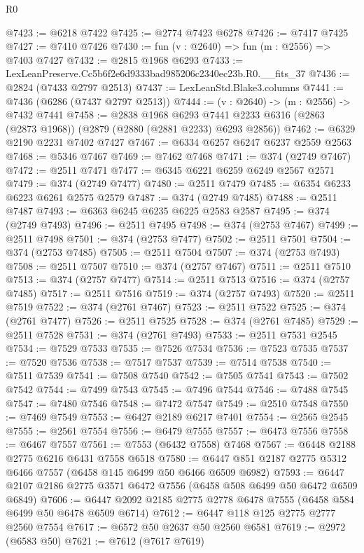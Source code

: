\begin{lexlean}{R0}
\begin{coremodule}
@7423 := @6218 @7422
@7425 := @2774 @7423 @6278
@7426 := @7417 @7425
@7427 := @7410 @7426
@7430 := fun (v : @2640) => fun (m : @2556) => @7403 @7427
@7432 := @2815 @1968 @6293
@7433 := LexLeanPreserve.Cc5b6f2e6d9333bad985206c2340ec23b.R0.__fits_37
@7436 := @2824 (@7433 @2797 @2513)
@7437 := LexLeanStd.Blake3.columns
@7441 := @7436 (@6286 (@7437 @2797 @2513))
@7444 := (v : @2640) -> (m : @2556) -> @7432 @7441
@7458 := @2838
    @1968
    @6293
    @7441
    @2233
    @6316
    (@2863 (@2873 @1968))
    (@2879 (@2880 (@2881 @2233) @6293 @2856))
@7462 := @6329 @2190 @2231 @7402 @7427
@7467 := @6334 @6257 @6247 @6237 @2559 @2563
@7468 := @5346 @7467
@7469 := @7462 @7468
@7471 := @374 (@2749 @7467)
@7472 := @2511 @7471
@7477 := @6345 @6221 @6259 @6249 @2567 @2571
@7479 := @374 (@2749 @7477)
@7480 := @2511 @7479
@7485 := @6354 @6233 @6223 @6261 @2575 @2579
@7487 := @374 (@2749 @7485)
@7488 := @2511 @7487
@7493 := @6363 @6245 @6235 @6225 @2583 @2587
@7495 := @374 (@2749 @7493)
@7496 := @2511 @7495
@7498 := @374 (@2753 @7467)
@7499 := @2511 @7498
@7501 := @374 (@2753 @7477)
@7502 := @2511 @7501
@7504 := @374 (@2753 @7485)
@7505 := @2511 @7504
@7507 := @374 (@2753 @7493)
@7508 := @2511 @7507
@7510 := @374 (@2757 @7467)
@7511 := @2511 @7510
@7513 := @374 (@2757 @7477)
@7514 := @2511 @7513
@7516 := @374 (@2757 @7485)
@7517 := @2511 @7516
@7519 := @374 (@2757 @7493)
@7520 := @2511 @7519
@7522 := @374 (@2761 @7467)
@7523 := @2511 @7522
@7525 := @374 (@2761 @7477)
@7526 := @2511 @7525
@7528 := @374 (@2761 @7485)
@7529 := @2511 @7528
@7531 := @374 (@2761 @7493)
@7533 := @2511 @7531 @2545
@7534 := @7529 @7533
@7535 := @7526 @7534
@7536 := @7523 @7535
@7537 := @7520 @7536
@7538 := @7517 @7537
@7539 := @7514 @7538
@7540 := @7511 @7539
@7541 := @7508 @7540
@7542 := @7505 @7541
@7543 := @7502 @7542
@7544 := @7499 @7543
@7545 := @7496 @7544
@7546 := @7488 @7545
@7547 := @7480 @7546
@7548 := @7472 @7547
@7549 := @2510 @7548
@7550 := @7469 @7549
@7553 := @6427 @2189 @6217 @7401
@7554 := @2565 @2545
@7555 := @2561 @7554
@7556 := @6479 @7555
@7557 := @6473 @7556
@7558 := @6467 @7557
@7561 := @7553 (@6432 @7558) @7468
@7567 := @6448 @2188 @2775 @6216 @6431 @7558 @6518
@7580 := @6447 @851 @2187 @2775 @5312 @6466 @7557 (@6458 @145 @6499 @50 @6466 @6509 @6982)
@7593 := @6447 @2107 @2186 @2775 @3571 @6472 @7556 (@6458 @508 @6499 @50 @6472 @6509 @6849)
@7606 := @6447 @2092 @2185 @2775 @2778 @6478 @7555 (@6458 @584 @6499 @50 @6478 @6509 @6714)
@7612 := @6447 @118 @125 @2775 @2777 @2560 @7554
@7617 := @6572 @50 @2637 @50 @2560 @6581
@7619 := @2972 (@6583 @50)
@7621 := @7612 (@7617 @7619)

\end{coremodule}
\end{lexlean}
